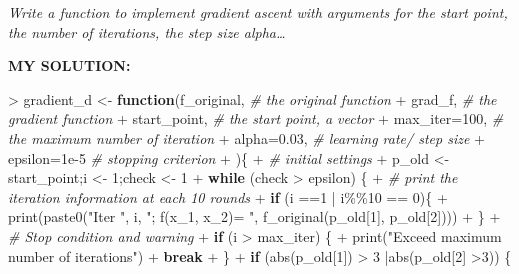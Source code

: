\documentclass[
]{article}
\newenvironment{Shaded}{\begin{snugshade}}{\end{snugshade}}
\newcommand{\AttributeTok}[1]{\textcolor[rgb]{0.77,0.63,0.00}{#1}}
\newcommand{\CommentTok}[1]{\textcolor[rgb]{0.56,0.35,0.01}{\textit{#1}}}
\newcommand{\ControlFlowTok}[1]{\textcolor[rgb]{0.13,0.29,0.53}{\textbf{#1}}}
\newcommand{\DecValTok}[1]{\textcolor[rgb]{0.00,0.00,0.81}{#1}}
\newcommand{\FloatTok}[1]{\textcolor[rgb]{0.00,0.00,0.81}{#1}}
\newcommand{\FunctionTok}[1]{\textcolor[rgb]{0.00,0.00,0.00}{#1}}
\newcommand{\NormalTok}[1]{#1}
\newcommand{\OtherTok}[1]{\textcolor[rgb]{0.56,0.35,0.01}{#1}}
\newcommand{\SpecialCharTok}[1]{\textcolor[rgb]{0.00,0.00,0.00}{#1}}
\newcommand{\StringTok}[1]{\textcolor[rgb]{0.31,0.60,0.02}{#1}}
\begin{document}
\emph{Write a function to implement gradient ascent with arguments for
the start point, the number of iterations, the step size alpha\ldots{}}

\textbf{MY SOLUTION:}

\begin{Shaded}
\begin{Highlighting}[]
\SpecialCharTok{\textgreater{}}\NormalTok{ gradient\_d }\OtherTok{\textless{}{-}} \ControlFlowTok{function}\NormalTok{(f\_original, }\CommentTok{\# the original function}
\SpecialCharTok{+}\NormalTok{                        grad\_f, }\CommentTok{\# the gradient function}
\SpecialCharTok{+}\NormalTok{                        start\_point, }\CommentTok{\# the start point, a vector}
\SpecialCharTok{+}                        \AttributeTok{max\_iter=}\DecValTok{100}\NormalTok{, }\CommentTok{\# the maximum number of iteration}
\SpecialCharTok{+}                        \AttributeTok{alpha=}\FloatTok{0.03}\NormalTok{, }\CommentTok{\# learning rate/ step size}
\SpecialCharTok{+}                        \AttributeTok{epsilon=}\FloatTok{1e{-}5} \CommentTok{\# stopping criterion}
\SpecialCharTok{+}\NormalTok{ )\{}
\SpecialCharTok{+}   \CommentTok{\# initial settings}
\SpecialCharTok{+}\NormalTok{   p\_old }\OtherTok{\textless{}{-}}\NormalTok{ start\_point;i }\OtherTok{\textless{}{-}} \DecValTok{1}\NormalTok{;check }\OtherTok{\textless{}{-}} \DecValTok{1}
\SpecialCharTok{+}   \ControlFlowTok{while}\NormalTok{ (check }\SpecialCharTok{\textgreater{}}\NormalTok{ epsilon) \{}
\SpecialCharTok{+}     \CommentTok{\# print the iteration information at each 10 rounds}
\SpecialCharTok{+}     \ControlFlowTok{if}\NormalTok{ (i }\SpecialCharTok{==}\DecValTok{1} \SpecialCharTok{|}\NormalTok{ i}\SpecialCharTok{\%\%}\DecValTok{10} \SpecialCharTok{==} \DecValTok{0}\NormalTok{)\{}
\SpecialCharTok{+}      \FunctionTok{print}\NormalTok{(}\FunctionTok{paste0}\NormalTok{(}\StringTok{"Iter "}\NormalTok{, i, }\StringTok{"; f(x\_1, x\_2)= "}\NormalTok{, }\FunctionTok{f\_original}\NormalTok{(p\_old[}\DecValTok{1}\NormalTok{], p\_old[}\DecValTok{2}\NormalTok{])))}
\SpecialCharTok{+}\NormalTok{     \}}
\SpecialCharTok{+}     \CommentTok{\# Stop condition and warning}
\SpecialCharTok{+}     \ControlFlowTok{if}\NormalTok{ (i }\SpecialCharTok{\textgreater{}}\NormalTok{ max\_iter) \{}
\SpecialCharTok{+}       \FunctionTok{print}\NormalTok{(}\StringTok{"Exceed maximum number of iterations"}\NormalTok{)}
\SpecialCharTok{+}       \ControlFlowTok{break}
\SpecialCharTok{+}\NormalTok{       \}}
\SpecialCharTok{+}     \ControlFlowTok{if}\NormalTok{ (}\FunctionTok{abs}\NormalTok{(p\_old[}\DecValTok{1}\NormalTok{]) }\SpecialCharTok{\textgreater{}} \DecValTok{3} \SpecialCharTok{|}\FunctionTok{abs}\NormalTok{(p\_old[}\DecValTok{2}\NormalTok{] }\SpecialCharTok{\textgreater{}}\DecValTok{3}\NormalTok{)) \{}

\end{Highlighting}
\end{Shaded}
\end{document}
